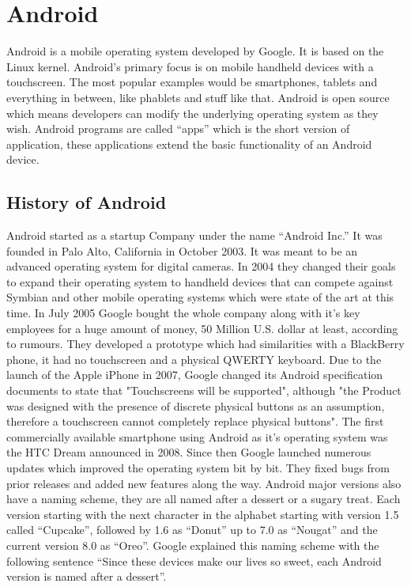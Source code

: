 \chapter{Android}
\label{ch:Android}
Android is a mobile operating system developed by Google. It is based on the Linux kernel. Android's primary focus is on mobile handheld devices with a touchscreen. The most popular examples would be smartphones, tablets and everything in between, like phablets and stuff like that. Android is open source which means developers can modify the underlying operating system as they wish. Android programs are called ``apps'' which is the short version of application, these applications extend the basic functionality of an Android device.

\section{History of Android}
Android started as a startup Company under the name ``Android Inc.'' It was founded in Palo Alto, California in October 2003. It was meant to be an advanced operating system for digital cameras. In 2004 they changed their goals to expand their operating system to handheld devices that can compete against Symbian and other mobile operating systems which were state of the art at this time. In July 2005 Google bought the whole company along with it's key employees for a huge amount of money, 50 Million U.S. dollar at least, according to rumours. They developed a prototype which had similarities with a BlackBerry phone, it had no touchscreen and a physical QWERTY keyboard. Due to the launch of the Apple iPhone in 2007, Google changed its Android specification documents to state that "Touchscreens will be supported", although "the Product was designed with the presence of discrete physical buttons as an assumption, therefore a touchscreen cannot completely replace physical buttons". The first commercially available smartphone using Android as it's operating system was the HTC Dream announced in 2008. Since then Google launched numerous updates which improved the operating system bit by bit. They fixed bugs from prior releases and added new features along the way. Android major versions also have a naming scheme, they are all named after a dessert or a sugary treat. Each version starting with the next character in the alphabet starting with version 1.5 called ``Cupcake'', followed by 1.6 as ``Donut'' up to 7.0 as ``Nougat'' and the current version 8.0 as ``Oreo''. Google explained this naming scheme with the following sentence ``Since these devices make our lives so sweet, each Android version is named after a dessert''.

